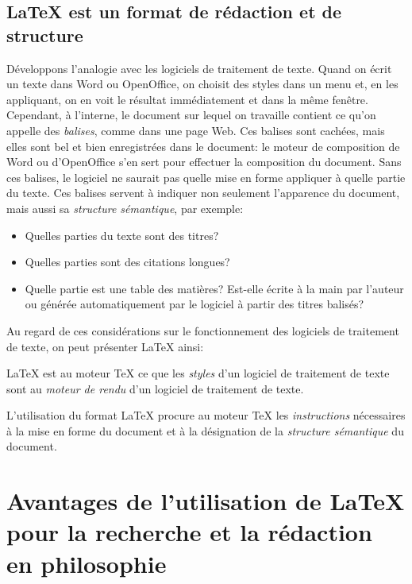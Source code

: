 \documentclass{article}
\newenvironment{defex}
{\begin{tcolorbox}[
    colback=yellow!5!white,
    colframe=red!25!black,
    coltext=red!25!black,
    arc=0mm,
    outer arc=0mm,
    toprule=0mm,
    bottomrule=0mm,
]}
{\end{tcolorbox}}
\begin{document}
\subsection{\LaTeX{} est un format de rédaction et de structure}

Développons l’analogie avec les logiciels de traitement de texte.
Quand on écrit un texte dans Word ou OpenOffice, on choisit des styles dans un menu et, en les appliquant, on en voit le résultat immédiatement et dans la même fenêtre. Cependant, à l’interne, le document sur lequel on travaille contient ce qu’on appelle des \emph{balises}, comme dans une page Web. Ces balises sont cachées, mais elles sont bel et bien enregistrées dans le document: le moteur de composition de Word ou d’OpenOffice s’en sert pour effectuer la composition du document. Sans ces balises, le logiciel ne saurait pas quelle mise en forme appliquer à quelle partie du texte. Ces balises servent à indiquer non seulement l’apparence du document, mais aussi sa \emph{structure sémantique}, par exemple:

\begin{itemize}
\item Quelles parties du texte sont des titres?
\item Quelles parties sont des citations longues?
\item Quelle partie est une table des matières? Est-elle écrite à la main par l’auteur ou générée automatiquement par le logiciel à partir des titres balisés?
\end{itemize}

Au regard de ces considérations sur le fonctionnement des logiciels de traitement de texte, on peut présenter \LaTeX{} ainsi:

\begin{defex}
\LaTeX{} est au moteur \TeX{} ce que les \emph{styles} d’un logiciel de traitement de texte sont au \emph{moteur de rendu} d’un logiciel de traitement de texte.

L’utilisation du format \LaTeX{} procure au moteur \TeX{} les \emph{instructions} nécessaires à la mise en forme du document et à la désignation de la \emph{structure sémantique} du document.
\end{defex}

\section{Avantages de l’utilisation de \LaTeX{} pour la recherche et la rédaction en philosophie}
\end{document}
